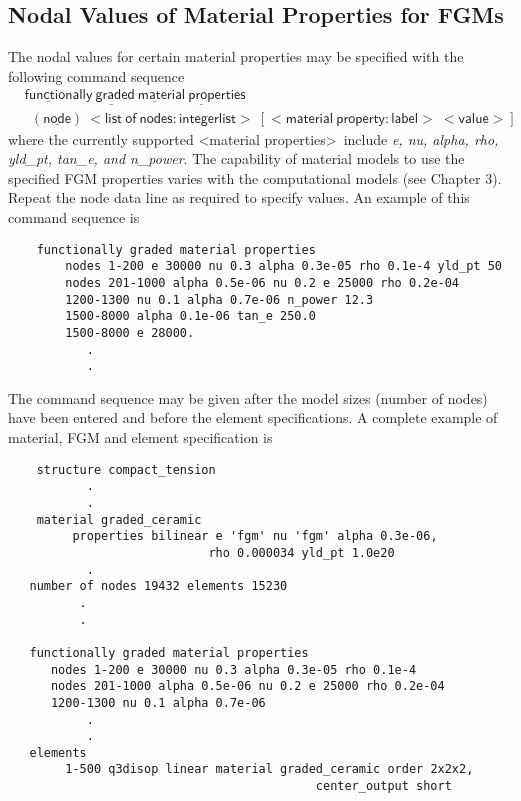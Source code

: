 \documentclass[11pt]{report}
\numberwithin{equation}{section}
\newcommand{\nin} {\noindent}
\newcommand{\ul} {\underline}
\newcommand{\hv} {\mathsf}   %
\newcommand{\ti}{\emph}
\begin{document}
\subsection{Nodal Values of Material Properties for FGMs}
\nin
The nodal values for certain material properties may be specified with the
following command sequence
\begin{align*}
&\hv{\ul{function}ally\ \ul{grade}d\ \ul{mater}ial\ \ul{prop}erties} \\
&\hv{\ \ (\ul{node})\ <list\ of\ nodes:integerlist>\ [<material\ property:label>\ <value>]}
\end{align*}\normalsize
\nin where the currently supported \textless material properties\textgreater\ include \ti{e, nu, alpha, rho,
yld\_pt, tan\_e, and n\_power}. The capability of material models to use the
specified FGM properties varies with the computational models (see Chapter 3). 
Repeat the node data line as required to specify values. An example of
this command sequence is

\small
\begin{verbatim}
    functionally graded material properties
        nodes 1-200 e 30000 nu 0.3 alpha 0.3e-05 rho 0.1e-4 yld_pt 50
        nodes 201-1000 alpha 0.5e-06 nu 0.2 e 25000 rho 0.2e-04
        1200-1300 nu 0.1 alpha 0.7e-06 n_power 12.3 
        1500-8000 alpha 0.1e-06 tan_e 250.0
        1500-8000 e 28000.
           .
           .
\end{verbatim} \normalsize

\nin The command sequence may be given after the model sizes (number of nodes) have
been entered and before the element specifications. A complete example of
material, FGM and element specification is 
\small
\begin{verbatim}
    structure compact_tension
           .
           .
    material graded_ceramic
         properties bilinear e 'fgm' nu 'fgm' alpha 0.3e-06,
	                        rho 0.000034 yld_pt 1.0e20
           .
   number of nodes 19432 elements 15230
          .
          .

   functionally graded material properties
      nodes 1-200 e 30000 nu 0.3 alpha 0.3e-05 rho 0.1e-4
      nodes 201-1000 alpha 0.5e-06 nu 0.2 e 25000 rho 0.2e-04
      1200-1300 nu 0.1 alpha 0.7e-06 
           .
           .
   elements
        1-500 q3disop linear material graded_ceramic order 2x2x2,
                                           center_output short 
\end{verbatim} \normalsize
\end{document}
